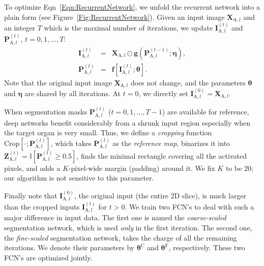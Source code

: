\documentclass[10pt,twocolumn,letterpaper]{article}
\begin{document}
To optimize Eqn~\eqref{Eqn:RecurrentNetwork},
we unfold the recurrent network into a plain form (see Figure~\ref{Fig:RecurrentNetwork}).
Given an input image $\mathbf{X}_{\mathrm{A},l}$ and an integer $T$ which is the maximal number of iterations,
we update $\mathbf{I}_{\mathrm{A},l}^{\left(t\right)}$ and $\mathbf{P}_{\mathrm{A},l}^{\left(t\right)}$, ${t}={0,1,\ldots,T}$:
\begin{eqnarray}
\label{Eqn:RecurrentComputation}
{\mathbf{I}_{\mathrm{A},l}^{\left(t\right)}} & = &
    {\mathbf{X}_{\mathrm{A},l}\odot\mathbf{g}\!\left(\mathbf{P}_{\mathrm{A},l}^{\left(t-1\right)};\boldsymbol{\eta}\right)}, \\
{\mathbf{P}_{\mathrm{A},l}^{\left(t\right)}} & = &
    {\mathbf{f}\!\left[\mathbf{I}_{\mathrm{A},l}^{\left(t\right)};\boldsymbol{\theta}\right]}.
\end{eqnarray}
Note that the original input image $\mathbf{X}_{\mathrm{A},l}$ does not change,
and the parameters $\boldsymbol{\theta}$ and $\boldsymbol{\eta}$ are shared by all iterations.
At ${t}={0}$, we directly set ${\mathbf{I}_{\mathrm{A},l}^{\left(0\right)}}={\mathbf{X}_{\mathrm{A},l}}$.

When segmentation masks $\mathbf{P}_{\mathrm{A},l}^{\left(t\right)}$ (${t}={0,1,\ldots,T-1}$) are available for reference,
deep networks benefit considerably from a shrunk input region especially when the target organ is very small.
Thus, we define a {\em cropping} function $\mathrm{Crop}\!\left[\cdot;\mathbf{P}_{\mathrm{A},l}^{\left(t\right)}\right]$,
which takes $\mathbf{P}_{\mathrm{A},l}^{\left(t\right)}$ as the {\em reference map},
binarizes it into ${\mathbf{Z}_{\mathrm{A},l}^{\left(t\right)}}=
    {\mathbb{I}\!\left[\mathbf{P}_{\mathrm{A},l}^{\left(t\right)}\geqslant0.5\right]}$,
finds the minimal rectangle covering all the activated pixels, and adds a $K$-pixel-wide margin (padding) around it.
We fix $K$ to be $20$; our algorithm is not sensitive to this parameter.

Finally note that $\mathbf{I}_{\mathrm{A},l}^{\left(0\right)}$, the original input (the entire 2D slice),
is much larger than the cropped inputs $\mathbf{I}_{\mathrm{A},l}^{\left(t\right)}$ for ${t}>{0}$.
We train two FCN's to deal with such a major difference in input data.
The first one is named the {\em coarse-scaled} segmentation network, which is used {\em only} in the first iteration.
The second one, the {\em fine-scaled} segmentation network, takes the charge of all the remaining iterations.
We denote their parameters by $\boldsymbol{\theta}^\mathrm{C}$ and $\boldsymbol{\theta}^\mathrm{F}$, respectively.
These two FCN's are optimized jointly.
\end{document}
